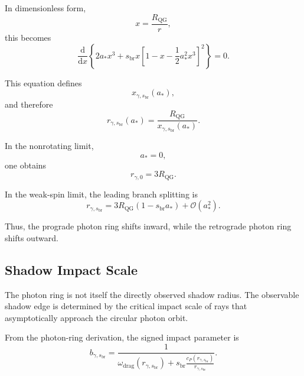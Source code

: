 In dimensionless form,
\begin{equation}
    x = \frac{R_{\mathrm{QG}}}{r},
\end{equation}
this becomes
\begin{equation}
    \boxed{ \frac{\mathrm{d}}{\mathrm{d}x} \left\{ 2a_\ast x^3 + s_{\mathrm{br}} x \left[ 1-x-\frac{1}{2}a_\ast^2x^3 \right]^2 \right\} = 0. }
\end{equation}

This equation defines
\begin{equation}
    x_{\gamma,s_{\mathrm{br}}}(a_\ast),
\end{equation}
and therefore
\begin{equation}
    \boxed{ r_{\gamma,s_{\mathrm{br}}}(a_\ast) = \frac{R_{\mathrm{QG}}}{x_{\gamma,s_{\mathrm{br}}}(a_\ast)}. }
\end{equation}

In the nonrotating limit,
\begin{equation}
    a_\ast = 0,
\end{equation}
one obtains
\begin{equation}
    \boxed{ r_{\gamma,0} = 3R_{\mathrm{QG}}. }
\end{equation}

In the weak-spin limit, the leading branch splitting is
\begin{equation}
    \boxed{ r_{\gamma,s_{\mathrm{br}}} = 3R_{\mathrm{QG}} \left( 1-s_{\mathrm{br}} a_\ast \right) + \mathcal{O}(a_\ast^2). }
\end{equation}

Thus, the prograde photon ring shifts inward, while the retrograde photon ring shifts outward.

\subsection{Shadow Impact Scale}

The photon ring is not itself the directly observed shadow radius. The observable shadow edge is determined by the critical impact scale of rays that asymptotically approach the circular photon orbit.

From the photon-ring derivation, the signed impact parameter is
\begin{equation}
    b_{\gamma,s_{\mathrm{br}}} = \frac{1}{ \omega_{\mathrm{drag}}(r_{\gamma,s_{\mathrm{br}}}) + s_{\mathrm{br}} \frac{c_P(r_{\gamma,s_{\mathrm{br}}})}{r_{\gamma,s_{\mathrm{br}}}} }.
\end{equation}

